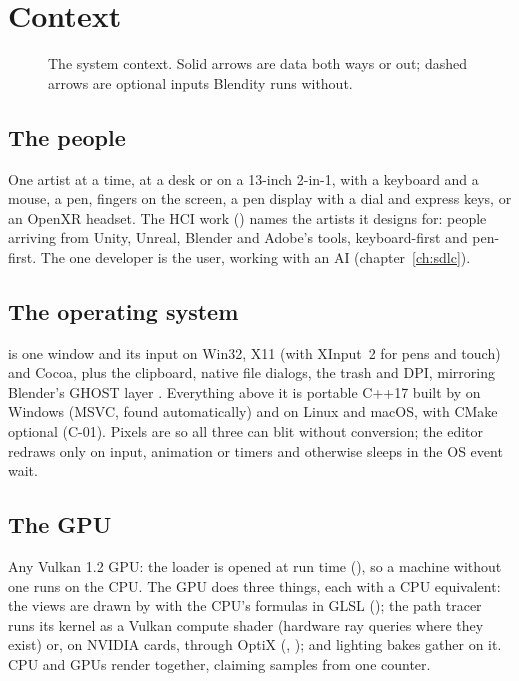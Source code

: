 \chapter{Context}
\label{ch:context}

\begin{figure}[H]
  \centering
  \resizebox{\textwidth}{!}{}
  \caption{The system context. Solid arrows are data both ways or out; dashed arrows are optional inputs Blendity runs without.}
  \label{fig:context}
\end{figure}

\section{The people}
One artist at a time, at a desk or on a 13-inch 2-in-1, with a keyboard and a mouse, a pen, fingers on the screen, a
pen display with a dial and express keys, or an OpenXR headset. The HCI work () names the artists it designs
for: people arriving from Unity, Unreal, Blender and Adobe's tools, keyboard-first and pen-first. The one developer is
the user, working with an AI (chapter~\ref{ch:sdlc}).

\section{The operating system}
 is one window and its input on Win32, X11 (with XInput~2 for pens and touch) and Cocoa, plus the
clipboard, native file dialogs, the trash and DPI, mirroring Blender's GHOST layer \cite{Blender2026}. Everything above
it is portable C++17 built by  on Windows (MSVC, found automatically) and  on Linux and
macOS, with CMake optional (C-01). Pixels are  so all three can blit without conversion; the editor
redraws only on input, animation or timers and otherwise sleeps in the OS event wait.

\section{The GPU}
Any Vulkan 1.2 GPU: the loader is opened at run time (), so a machine without one runs on the
CPU. The GPU does three things, each with a CPU equivalent: the views are drawn by  with the CPU's
formulas in GLSL (); the path tracer runs its kernel as a Vulkan compute shader (hardware ray queries where
they exist) or, on NVIDIA cards, through OptiX (, ); and lighting bakes gather on it. CPU and GPUs
render together, claiming samples from one counter.


